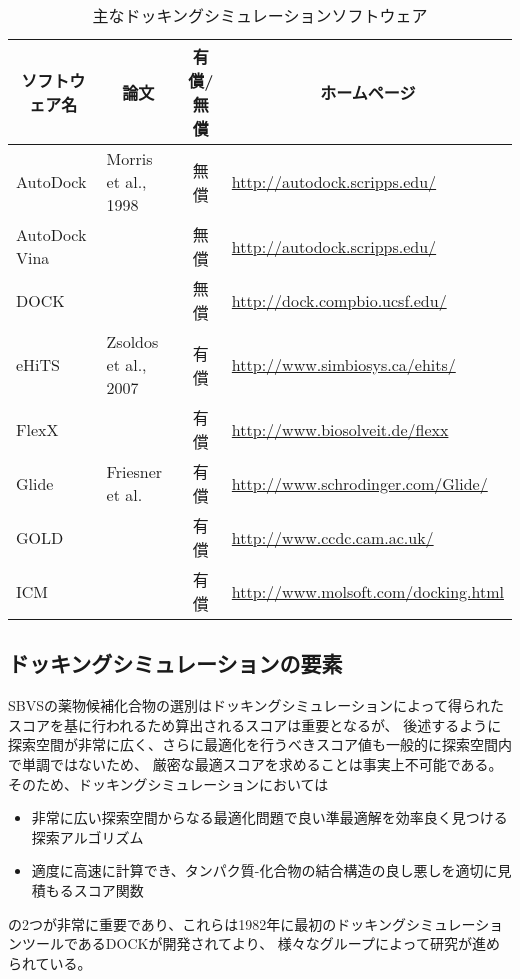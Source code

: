 \begin{table}[htb] \centering
	\caption{主なドッキングシミュレーションソフトウェア}
	\label{table:docking_tools_eg}
	\begin{tabular}{llcl}
	\hline
	\multicolumn{1}{c}{ソフトウェア名}	&\multicolumn{1}{c}{論文}			&\multicolumn{1}{c}{有償/無償}	&\multicolumn{1}{c}{ホームページ}	\\ \hline
	AutoDock					&Morris et al., 1998\cite{Morris1998}												&無償									&\url{http://autodock.scripps.edu/}	\\ 
	AutoDock Vina			&																											&無償									&\url{http://autodock.scripps.edu/}	\\ 
	DOCK							&\cite{Ewing2001}																				&無償									&\url{http://dock.compbio.ucsf.edu/}	\\
	eHiTS							&Zsoldos et al., 2007\cite{Zsoldos2007}											&有償									&\url{http://www.simbiosys.ca/ehits/}	\\
	FlexX							&																											&有償									&\url{http://www.biosolveit.de/flexx}	\\
	Glide							&Friesner et al.\cite{Friesner2004}													&有償									&\url{http://www.schrodinger.com/Glide/}	\\
	GOLD							&\cite{Jones1997}																				&有償									&\url{http://www.ccdc.cam.ac.uk/}	\\
	ICM								&																											&有償									&\url{http://www.molsoft.com/docking.html}	\\ \hline
	\end{tabular}
\end{table}


\subsection{ドッキングシミュレーションの要素}\label{subsec:docking_elements}
SBVSの薬物候補化合物の選別はドッキングシミュレーションによって得られたスコアを基に行われるため算出されるスコアは重要となるが、
後述するように探索空間が非常に広く、さらに最適化を行うべきスコア値も一般的に探索空間内で単調ではないため、
厳密な最適スコアを求めることは事実上不可能である。そのため、ドッキングシミュレーションにおいては
\begin{itemize}
\item 非常に広い探索空間からなる最適化問題で良い準最適解を効率良く見つける探索アルゴリズム
\item 適度に高速に計算でき、タンパク質-化合物の結合構造の良し悪しを適切に見積もるスコア関数
\end{itemize}
の2つが非常に重要であり、これらは1982年に最初のドッキングシミュレーションツールであるDOCK\cite{Kuntz1982}が開発されてより、
様々なグループによって研究が進められている。

